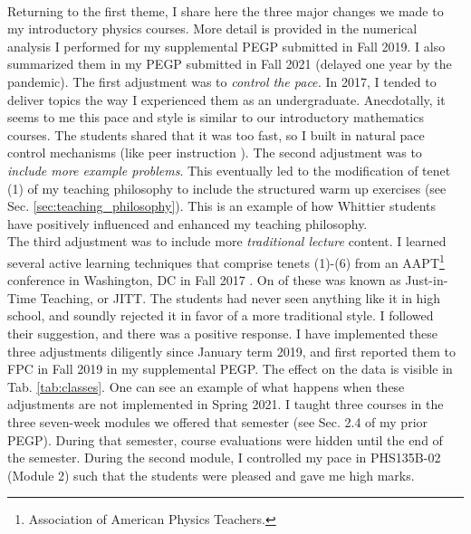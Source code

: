 \documentclass[../../../main.tex]{subfiles}
\begin{document}
\\
\vspace{0.15cm}
Returning to the first theme, I share here the three major changes we made to my introductory physics courses.  More detail is provided in the numerical analysis I performed for my supplemental PEGP submitted in Fall 2019.  I also summarized them in my PEGP submitted in Fall 2021 (delayed one year by the pandemic).  The first adjustment was to \textit{control the pace.}  In 2017, I tended to deliver topics the way I experienced them as an undergraduate.  Anecdotally, it seems to me this pace and style is similar to our introductory mathematics courses.  The students shared that it was too fast, so I built in natural pace control mechanisms (like peer instruction \cite{mazur2013peer}).  The second adjustment was to \textit{include more example problems}.  This eventually led to the modification of tenet (1) of my teaching philosophy to include the structured warm up exercises (see Sec. \ref{sec:teaching_philosophy}).  This is an example of how Whittier students have positively influenced and enhanced my teaching philosophy.
\\
\vspace{0.15cm}
The third adjustment was to include more \textit{traditional lecture} content.  I learned several active learning techniques that comprise tenets (1)-(6) from an AAPT\footnote{Association of American Physics Teachers.} conference in Washington, DC in Fall 2017 \cite{AAPTPI}.  On of these was known as Just-in-Time Teaching, or JITT.  The students had never seen anything like it in high school, and soundly rejected it in favor of a more traditional style.  I followed their suggestion, and there was a positive response.  I have implemented these three adjustments diligently since January term 2019, and first reported them to FPC in Fall 2019 in my supplemental PEGP.  The effect on the data is visible in Tab. \ref{tab:classes}.  One can see an example of what happens when these adjustments are not implemented in Spring 2021.  I taught three courses in the three seven-week modules we offered that semester (see Sec. 2.4 of my prior PEGP).  During that semester, course evaluations were hidden until the end of the semester.  During the second module, I controlled my pace in PHS135B-02 (Module 2) such that the students were pleased and gave me high marks.
\\
\vspace{0.15cm}
\end{document}
